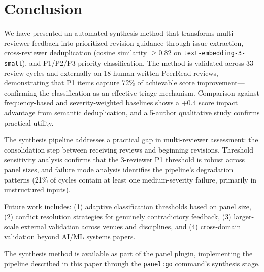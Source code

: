 \section{Conclusion}

We have presented an automated synthesis method that transforms multi-reviewer feedback into prioritized revision guidance through issue extraction, cross-reviewer deduplication (cosine similarity $\geq 0.82$ on \texttt{text-embedding-3-small}), and P1/P2/P3 priority classification. The method is validated across 33+ review cycles and externally on 18 human-written PeerRead reviews, demonstrating that P1 items capture 72\% of achievable score improvement---confirming the classification as an effective triage mechanism. Comparison against frequency-based and severity-weighted baselines shows a +0.4 score impact advantage from semantic deduplication, and a 5-author qualitative study confirms practical utility.

The synthesis pipeline addresses a practical gap in multi-reviewer assessment: the consolidation step between receiving reviews and beginning revisions. Threshold sensitivity analysis confirms that the 3-reviewer P1 threshold is robust across panel sizes, and failure mode analysis identifies the pipeline's degradation patterns (21\% of cycles contain at least one medium-severity failure, primarily in unstructured inputs).

Future work includes: (1) adaptive classification thresholds based on panel size, (2) conflict resolution strategies for genuinely contradictory feedback, (3) larger-scale external validation across venues and disciplines, and (4) cross-domain validation beyond AI/ML systems papers.

The synthesis method is available as part of the panel plugin, implementing the pipeline described in this paper through the \texttt{panel:go} command's synthesis stage.
